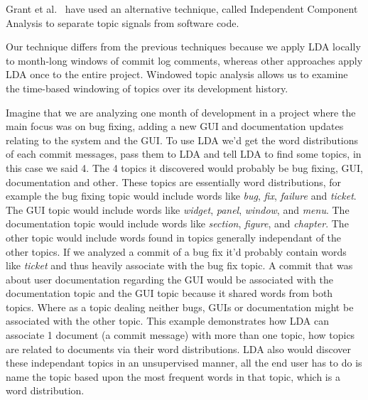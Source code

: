 \documentclass[times, 10pt,twocolumn]{article}
\begin{document}
Grant et al.~\cite{scottcordy} have used an alternative technique,
called Independent Component Analysis to separate topic signals from
software code.

Our technique differs from the previous techniques because we apply
LDA locally to month-long windows of commit log comments, whereas
other approaches apply LDA once to the entire project. Windowed topic
analysis allows us to examine the time-based windowing of topics over
its development history.



Imagine that we are analyzing one month of development in a project
where the main focus was on bug fixing, adding a new GUI and
documentation updates relating to the system and the GUI. To use LDA
we'd get the word distributions of each commit messages, pass them to
LDA and tell LDA to find some topics, in this case we said 4. The 4
topics it discovered would probably be bug fixing, GUI, documentation
and other. These topics are essentially word distributions, for
example the bug fixing topic would include words like \emph{bug},
\emph{fix}, \emph{failure} and \emph{ticket}. The GUI topic would
include words like \emph{widget}, \emph{panel}, \emph{window}, and
\emph{menu}. The documentation topic would include words like
\emph{section}, \emph{figure}, and \emph{chapter}. The other topic
would include words found in topics generally independant of the other
topics. If we analyzed a commit of a bug fix it'd probably contain
words like \emph{ticket} and thus heavily associate with the bug fix
topic. A commit that was about user documentation regarding the GUI
would be associated with the documentation topic and the GUI topic
because it shared words from both topics. Where as a topic dealing
neither bugs, GUIs or documentation might be associated with the other
topic. This example demonstrates how LDA can associate 1 document (a
commit message) with more than one topic, how topics are related to
documents via their word distributions. LDA also would discover these
independant topics in an unsupervised manner, all the end user has to
do is name the topic based upon the most frequent words in that topic,
which is a word distribution.
\end{document}
